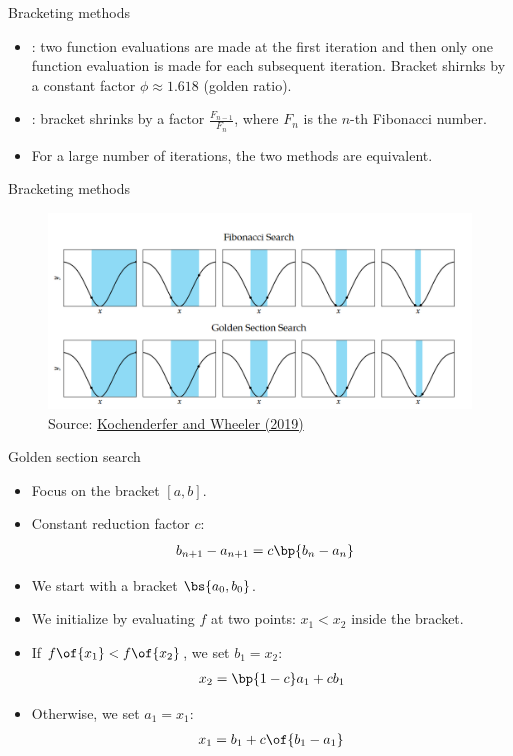 \documentclass[11pt,xcolor={dvipsnames},aspectratio=159,hyperref={pdftex,pdfpagemode=UseNone,hidelinks,pdfdisplaydoctitle=true},usepdftitle=false]{beamer}
\begin{document}
\begin{frame}{Bracketing methods}
    \begin{itemize}
\item {}: two function evaluations are made at the first iteration and
then only one function evaluation is made for each subsequent iteration. Bracket shirnks by a constant factor $\phi \approx 1.618$ (golden ratio).
\item {}: bracket shrinks by a factor $\frac{F_{n-1}}{F_n}$, where $F_n$ is the $n$-th Fibonacci number.
\item   For a large number of iterations, the two methods are equivalent.    
\end{itemize}
  
\end{frame}

\begin{frame}{Bracketing methods}
    \centering
    \begin{figure}
    \includegraphics[width=1\textwidth]{bracketing.png}
    \caption{Source: \href{https://mitpress.mit.edu/9780262039420/}{Kochenderfer and Wheeler (2019)}}
    \end{figure}
\end{frame}


\begin{frame}{Golden section search}
    \begin{itemize}
        \item Focus on the bracket $[a,b]$.
\item Constant reduction factor $c$: \begin{align*}
b_{n+1} - a_{n+1} &= c\bp{b_n - a_n}
\end{align*}
        \item We start with a bracket $\bs{a_0,b_0}$.
\item We initialize by evaluating $f$ at two points: $x_1 < x_2$ inside the bracket.
\item If $f\of{x_1} < f\of{x_2}$, we set $b_1 = x_2$:  \begin{align*}
    x_2 =  \bp{1-c} a_1 + c b_1
\end{align*}
\item Otherwise, we set $a_1 = x_1$: \begin{align*}
    x_1 = b_1 + c \of{b_1 - a_1}
\end{align*}
\end{itemize}
  
\end{frame}
\end{document}
